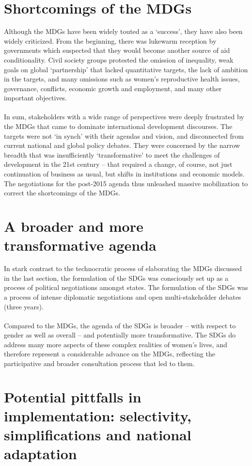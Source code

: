 \section*{Shortcomings of the MDGs}
Although the MDGs have been widely touted as a ‘success’, they have also been widely criticized. From the beginning, there was lukewarm reception by governments which suspected that they would become another source of aid conditionality. Civil society groups protested the omission of inequality, weak goals on global ‘partnership’ that lacked quantitative targets, the lack of ambition in the targets, and many omissions such as women’s reproductive health issues, governance, conflicts, economic growth and employment, and many other important objectives.\\
\\
In sum, stakeholders with a wide range of perspectives were deeply frustrated by the MDGs that came to dominate international development discourses. The targets were not ‘in synch’ with their agendas and vision, and disconnected from current national and global policy debates. They were concerned by the narrow breadth that was insufficiently ‘transformative’ to meet the challenges of development in the 21st century – that required a change, of course, not just continuation of business as usual, but shifts in institutions and economic models. The negotiations for the post-2015 agenda thus unleashed massive mobilization to correct the shortcomings of the MDGs. 

\section*{A broader and more transformative agenda}
In stark contrast to the technocratic process of elaborating the MDGs discussed in the last section, the formulation of the SDGs was consciously set up as a process of political negotiations amongst states. The formulation of the SDGs was a process of intense diplomatic negotiations and open multi-stakeholder debates (three years). \\
\\
Compared to the MDGs, the agenda of the SDGs is broader – with respect to gender as well as overall – and potentially more transformative. The SDGs do address many more aspects of these complex realities of women’s lives, and therefore represent a considerable advance on the MDGs, reflecting the participative and broader consultation process that led to them.

\section*{Potential pittfalls in implementation: selectivity, simplifications and national adaptation}

